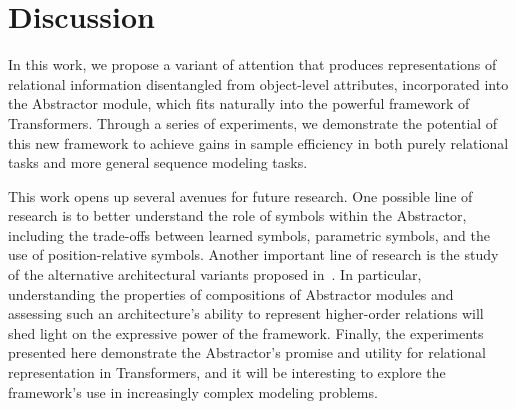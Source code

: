 \section{Discussion}\label{sec:discuss}


In this work, we propose a variant of attention that produces representations of relational information disentangled from object-level attributes, incorporated into the Abstractor module, which fits naturally into the powerful framework of Transformers. Through a series of experiments, we demonstrate the potential of this new framework to achieve gains in sample efficiency in both purely relational tasks and more general sequence modeling tasks.

This work opens up several avenues for future research. One possible line of research is to better understand the role of symbols within the Abstractor, including the trade-offs between learned symbols, parametric symbols, and the use of position-relative symbols. Another important line of research is the study of the alternative architectural variants proposed in~. In particular, understanding the properties of compositions of Abstractor modules and assessing such an architecture's ability to represent higher-order relations will shed light on the expressive power of the framework. Finally, the experiments presented here demonstrate the Abstractor's promise and utility for relational representation in Transformers, and it will be interesting to explore the framework's use in increasingly complex modeling problems. 
